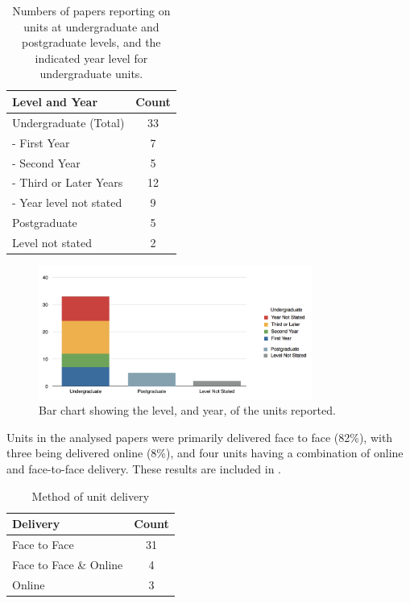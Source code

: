 \begin{table}[p]
	\centering
	\caption{Numbers of papers reporting on units at undergraduate and postgraduate levels, and the indicated year level for undergraduate units.}
	\label{tbl:year_level}
	\footnotesize
    \begin{tabular}{lc}
    \textbf{Level and Year} & \textbf{Count} \\ \hline
		Undergraduate (Total)	 & 33 \\
		- First Year & 	7 \\
		- Second Year & 	5 \\
		- Third or Later Years	 & 12 \\
		- Year level not stated & 	9 \\
		Postgraduate & 	5 \\
		Level not stated & 2 \\
    \end{tabular}
\end{table}

\begin{figure}[htbp]
	\centering
	\includegraphics[width=0.8\textwidth]{LevelAndYear}
	\caption{Bar chart showing the level, and year, of the units reported.}
	\label{fig:year_level}
\end{figure}

Units in the analysed papers were primarily delivered face to face (82\%), with three being delivered online (8\%), and four units having a combination of online and face-to-face delivery. These results are included in .

\begin{table}[htbp]
	\centering
	\caption{Method of unit delivery}
	\label{tbl:delivery}
	\footnotesize
    \begin{tabular}{l|c}
    \textbf{Delivery} & \textbf{Count} \\ \hline
    Face to Face & 31 \\
    Face to Face \& Online & 4 \\
    Online & 3 \\
    \end{tabular}
\end{table}

